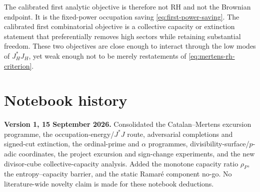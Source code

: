 \documentclass[11pt]{amsart}
\numberwithin{equation}{section}
\theoremstyle{plain}
\theoremstyle{definition}
\theoremstyle{remark}
\begin{document}
The calibrated first analytic objective is therefore not RH and not the Brownian endpoint.  It is the fixed-power occupation saving
\eqref{eq:first-power-saving}.  The calibrated first combinatorial objective is a collective capacity or extinction statement that preferentially
removes high sectors while retaining substantial freedom.  These two objectives are close enough to interact through the low modes of
$J_H^*J_H$, yet weak enough not to be merely restatements of \eqref{eq:mertens-rh-criterion}.

\section*{Notebook history}

\noindent
\textbf{Version 1, 15 September 2026.}
Consolidated the Catalan--Mertens excursion programme, the occupation-energy/$J^*J$ route, adversarial completions and signed-cut extinction,
the ordinal-prime and $\alpha$ programmes, divisibility-surface/$p$-adic coordinates, the project excursion and sign-change experiments, and
the new divisor-cube collective-capacity analysis.  Added the monotone capacity ratio $\rho_P$, the entropy--capacity barrier, and the static
Ramar\'e component no-go.  No literature-wide novelty claim is made for these notebook deductions.
\end{document}
